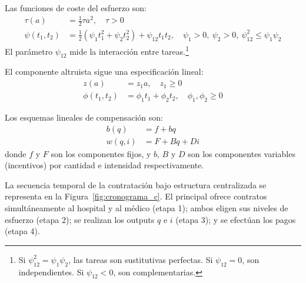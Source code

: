 Las funciones de coste del esfuerzo son:
\begin{align}
  \tau(a) &= \frac{1}{2}\tau a^2, \quad \tau>0 \label{eq:coste_h}\\
  \psi(t_1,t_2) &= \frac{1}{2}(\psi_1t_1^2+\psi_2t_2^2)+\psi_{12}t_1t_2, \quad \psi_1>0,\ \psi_2>0,\ \psi_{12}^2 \leq \psi_1\psi_2 \label{eq:coste_m}
\end{align}
El parámetro $\psi_{12}$ mide la interacción entre tareas.\footnote{Si $\psi_{12}^2=\psi_1\psi_2$, las tareas son sustitutivas perfectas. Si $\psi_{12}=0$, son independientes. Si $\psi_{12}<0$, son complementarias.}

El componente altruista sigue una especificación lineal:
\begin{align}
  z(a) &= z_1 a, \quad z_1 \geq 0 \label{eq:altruismo_h}\\
  \phi(t_1,t_2) &= \phi_1 t_1+\phi_2 t_2, \quad \phi_1, \phi_2 \geq 0 \label{eq:altruismo_m}
\end{align}

Los esquemas lineales de compensación son:
\begin{align}
  b(q) &= f+bq \label{eq:pago_h_lineal}\\
  w(q,i) &= F+Bq+Di \label{eq:pago_m_lineal}
\end{align}
donde $f$ y $F$ son los componentes fijos, y $b$, $B$ y $D$ son los componentes variables (incentivos) por cantidad e intensidad respectivamente.

La secuencia temporal de la contratación bajo estructura centralizada se representa en la Figura~\ref{fig:cronograma_c}. El principal ofrece contratos simultáneamente al hospital y al médico (etapa 1); ambos eligen sus niveles de esfuerzo (etapa 2); se realizan los outputs $q$ e $i$ (etapa 3); y se efectúan los pagos (etapa 4).

